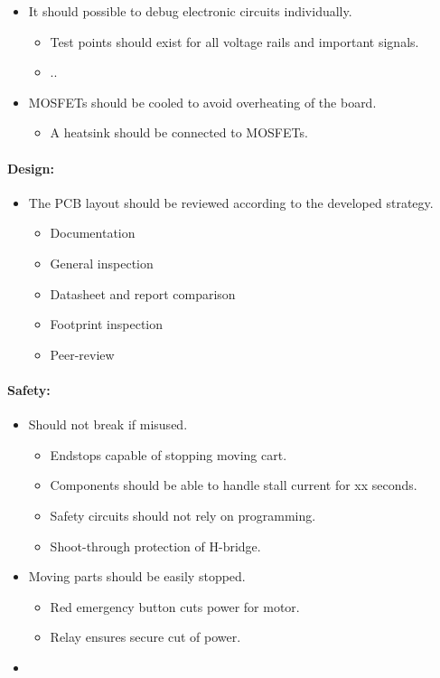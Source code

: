\begin{itemize}
	\item It should possible to debug electronic circuits individually.
	\begin{itemize}
		\item Test points should exist for all voltage rails and important signals.
		\item ..
	\end{itemize}

	\item MOSFETs should be cooled to avoid overheating of the board.
	\begin{itemize}
		\item A heatsink should be connected to MOSFETs.
	\end{itemize}
\end{itemize}


\paragraph{Design:}
\begin{itemize}
	\item The PCB layout should be reviewed according to the developed strategy.
	\begin{itemize}
		\item Documentation
		\item General inspection
		\item Datasheet and report comparison
		\item Footprint inspection 
		\item Peer-review
	\end{itemize}
\end{itemize}

	
\paragraph{Safety:}
\begin{itemize}
	\item Should not break if misused.
	\begin{itemize}
		\item Endstops capable of stopping moving cart.
		\item Components should be able to handle stall current for xx seconds.
		\item Safety circuits should not rely on programming.
		\item Shoot-through protection of H-bridge.
	\end{itemize}

	\item Moving parts should be easily stopped.
		\begin{itemize}
			\item Red emergency button cuts power for motor.
			\item Relay ensures secure cut of power.
		\end{itemize}

	\item 
\end{itemize}
